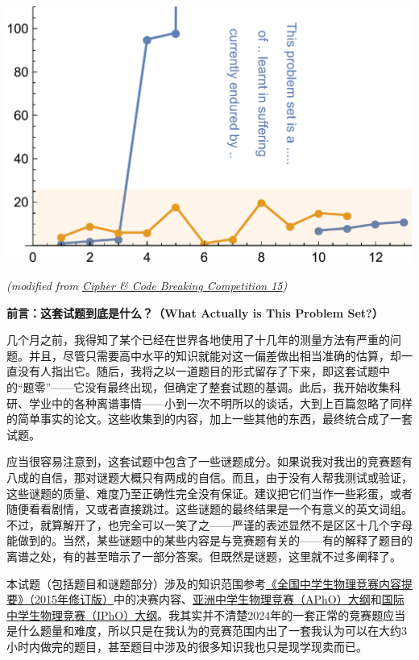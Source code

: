 \documentclass[11pt,a4paper,onecolumn,UTF8]{ctexart}
\begin{document}
	\begin{center}
		\centering
		\includegraphics[width=0.72\columnwidth]{0.png}
		
		\small{\textit{(modified from \href{https://ccbc15.cipherpuzzles.com/info/about}{Cipher \& Code Breaking Competition 15})}}
	\end{center}
	\vspace*{\fill}
	
	
	
	
	\setcounter{page}{0}
	
		
	
	
	
	
	
	
	\newpage
	\noindent
	\textbf{前言：这套试题到底是什么？（What Actually is This Problem Set?）}
	
	几个月之前，我得知了某个已经在世界各地使用了十几年的测量方法有严重的问题。并且，尽管只需要高中水平的知识就能对这一偏差做出相当准确的估算，却一直没有人指出它。随后，我将之以一道题目的形式留存了下来，即这套试题中的“题零”——它没有最终出现，但确定了整套试题的基调。此后，我开始收集科研、学业中的各种离谱事情——小到一次不明所以的谈话，大到上百篇忽略了同样的简单事实的论文。这些收集到的内容，加上一些其他的东西，最终统合成了一套试题。
	
	应当很容易注意到，这套试题中包含了一些谜题成分。如果说我对我出的竞赛题有八成的自信，那对谜题大概只有两成的自信。而且，由于没有人帮我测试或验证，这些谜题的质量、难度乃至正确性完全没有保证。建议把它们当作一些彩蛋，或者随便看看剧情，又或者直接跳过。这些谜题的最终结果是一个有意义的英文词组。不过，就算解开了，也完全可以一笑了之——严谨的表述显然不是区区十几个字母能做到的。当然，某些谜题中的某些内容是与竞赛题有关的——有的解释了题目的离谱之处，有的甚至暗示了一部分答案。但既然是谜题，这里就不过多阐释了。
	
	本试题（包括题目和谜题部分）涉及的知识范围参考\href{https://cpho.pku.edu.cn/info/1033/1042.htm}{《全国中学生物理竞赛内容提要》（2015年修订版）}中的决赛内容、\href{https://apho2024.utar.edu.my/Syllabus.php}{亚洲中学生物理竞赛（APhO）大纲}和\href{https://www.ipho2024.ir/page/5}{国际中学生物理竞赛（IPhO）大纲}。我其实并不清楚2024年的一套正常的竞赛题应当是什么题量和难度，所以只是在我认为的竞赛范围内出了一套我认为可以在大约3小时内做完的题目，甚至题目中涉及的很多知识我也只是现学现卖而已。
	
\end{document}
